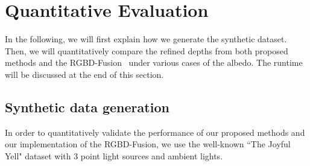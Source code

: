 \section{Quantitative Evaluation}
In the following, we will first explain how we generate the synthetic dataset.
Then, we will quantitatively compare the refined depths from both proposed methods and the RGBD-Fusion~\cite{or2015rgbd} under various cases of the albedo.
The runtime will be discussed at the end of this section.

\subsection{Synthetic data generation}\label{sec:synthetic}
In order to quantitatively validate the performance of our proposed methods and our implementation of the RGBD-Fusion, we use the well-known ``The Joyful Yell" dataset with 3 point light sources and ambient lights. 

